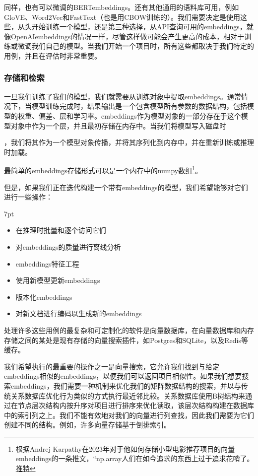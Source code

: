 \documentclass[Chinese, 11pt, table]{diazessay} %
\newenvironment{formal}{%
  \def\FrameCommand{%
	\hspace{1pt}%
	{\color{w_lightblue}\vrule width 2pt}%
	{\color{formalshade}\vrule width 4pt}%
	\colorbox{formalshade}%
  }%
  \MakeFramed{\advance\hsize-\width\FrameRestore}%
  \noindent\hspace{-4.55pt}%
  \begin{adjustwidth}{}{7pt}%
  \vspace{2pt}\vspace{2pt}%
}
{%
  \vspace{2pt}\end{adjustwidth}\endMakeFramed%
}
\begin{document}
\begin{CJK}{UTF8}{gbsn}
\begin{sloppypar}
同样，也有可以微调的BERTembeddings。还有其他通用的语料库可用，例如GloVE、Word2Vec和FastText（也是用CBOW训练的）。我们需要决定是使用这些，从头开始训练一个模型，还是第三种选择，从API查询可用的embeddings，就像OpenAIembeddings的情况一样，尽管这样做可能会产生更高的成本，相对于训练或微调我们自己的模型。当我们开始一个项目时，所有这些都取决于我们特定的用例，并且在评估时非常重要。

\subsubsection{存储和检索}

一旦我们训练了我们的模型，我们就需要从训练对象中提取embeddings。通常情况下，当模型训练完成时，结果输出是一个包含模型所有参数的数据结构，包括模型的权重、偏差、层和学习率。embeddings作为模型对象的一部分存在于这个模型对象中作为一个层，并且最初存储在内存中。当我们将模型写入磁盘时

，我们将其作为一个模型对象传播，并将其序列化到内存中，并在重新训练或推理时加载。

最简单的embeddings存储形式可以是一个内存中的numpy数组\footnote{根据Andrej Karpathy在2023年对于他如何存储小型电影推荐项目的向量embeddings的一条推文，“np.array人们在如今追求的东西上过于追求花哨了。 \href{https://twitter.com/karpathy/status/1647374645316968449}{推特}}。

但是，如果我们正在迭代构建一个带有embeddings的模型，我们希望能够对它们进行一些操作：

\begin{formal}
\begin{itemize}
  \item 在推理时批量和逐个访问它们
  \item 对embeddings的质量进行离线分析
  \item embeddings特征工程
  \item 使用新模型更新embeddings
  \item 版本化embeddings
  \item 对新文档进行编码以生成新的embeddings
\end{itemize}
\end{formal}

处理许多这些用例的最复杂和可定制化的软件是向量数据库，在向量数据库和内存存储之间的某处是现有存储的向量搜索插件，如Postgres和SQLite，以及Redis等缓存。

我们希望执行的最重要的操作之一是向量搜索，它允许我们找到与给定embeddings相似的embeddings，以便我们可以返回项目相似性。如果我们想要搜索embeddings，我们需要一种机制来优化我们的矩阵数据结构的搜索，并以与传统关系数据库优化行为类似的方式执行最近邻比较。关系数据库使用B树结构来通过在节点层次结构内按升序对项目进行排序来优化读取，该层次结构构建在数据库中的索引列之上。我们不能有效地对我们的向量进行列查找，因此我们需要为它们创建不同的结构。例如，许多向量存储基于倒排索引。


\end{sloppypar}
\end{CJK}
\end{document}
